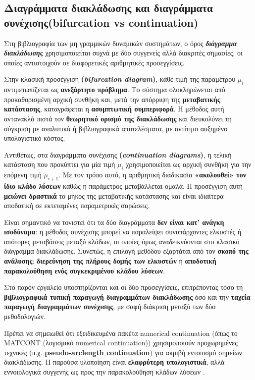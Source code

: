 \documentclass[11pt,a4paper]{report}
\begin{document}
\subsection{Διαγράμματα διακλάδωσης και διαγράμματα συνέχισης({bifurcation vs continuation})}
\label{subsec:bifurcation-vs-continuation}

Στη βιβλιογραφία των μη γραμμικών δυναμικών συστημάτων, ο όρος
\textbf{\emph{διάγραμμα διακλάδωσης}} χρησιμοποιείται συχνά με δύο συγγενείς αλλά
διακριτές σημασίες, οι οποίες αντιστοιχούν σε διαφορετικές αριθμητικές
προσεγγίσεις.

Στην κλασική προσέγγιση \textbf{(\emph{bifurcation diagram})}, κάθε τιμή της
παραμέτρου $\mu_i$ αντιμετωπίζεται ως \textbf{ανεξάρτητο πρόβλημα}. Το σύστημα
ολοκληρώνεται από προκαθορισμένη αρχική συνθήκη και, μετά την απόρριψη
της \textbf{μεταβατικής κατάστασης}, καταγράφεται η \textbf{ασυμπτωτική συμπεριφορά}.
Η μέθοδος αυτή αντανακλά πιστά τον \textbf{θεωρητικό ορισμό της διακλάδωσης} και
διευκολύνει τη σύγκριση με αναλυτικά ή βιβλιογραφικά αποτελέσματα, με
αντίτιμο αυξημένο υπολογιστικό κόστος.

Αντιθέτως, στα διαγράμματα συνέχισης \textbf{(\emph{continuation diagrams})},
η τελική κατάσταση που προκύπτει για μία τιμή $\mu_i$ χρησιμοποιείται
ως αρχική συνθήκη για την επόμενη τιμή $\mu_{i+1}$. Με τον τρόπο αυτό,
η αριθμητική διαδικασία \textbf{«ακολουθεί» τον ίδιο κλάδο λύσεων} καθώς η
παράμετρος μεταβάλλεται ομαλά. Η προσέγγιση αυτή \textbf{μειώνει δραστικά} το
μήκος της μεταβατικής κατάστασης και είναι ιδιαίτερα αποδοτική σε
εκτεταμένες παραμετρικές σαρώσεις.

Είναι σημαντικό να τονιστεί ότι τα δύο διαγράμματα \textbf{δεν είναι κατ’ ανάγκη
ισοδύναμα}: η μέθοδος συνέχισης μπορεί να παραλείψει συνυπάρχοντες
ελκυστές ή απότομες μεταβάσεις μεταξύ κλάδων, οι οποίες όμως
αναδεικνύονται στο κλασικό διάγραμμα διακλάδωσης. Συνεπώς, η επιλογή
μεθόδου εξαρτάται από τον \textbf{σκοπό της ανάλυσης}: \textbf{διερεύνηση της πλήρους
δομής των ελκυστών} ή \textbf{αποδοτική παρακολούθηση ενός συγκεκριμένου κλάδου
λύσεων}.

Στο παρόν εργαλείο υποστηρίζονται και οι δύο προσεγγίσεις, επιτρέποντας
τόσο τη \textbf{βιβλιογραφικά τυπική παραγωγή διαγραμμάτων διακλάδωσης} όσο και
την \textbf{ταχεία παραγωγή διαγραμμάτων συνέχισης}, με σαφή διάκριση μεταξύ των
δύο μεθοδολογιών.

Πρέπει να σημειωθεί ότι εξειδικευμένα πακέτα numerical continuation (όπως το MATCONT (λογισμικό numerical continuation))
χρησιμοποιούν προχωρημένες τεχνικές (π.χ. \textbf{pseudo-arclength continuation}) για ακριβή
εντοπισμό σημείων διακλάδωσης. Η παρούσα υλοποίηση είναι \textbf{ελαφρύτερη υπολογιστικά}, αλλά
εννοιολογικά συγγενής ως προς την παρακολούθηση κλάδων λύσεων \cite{matcont_software}.
\end{document}
